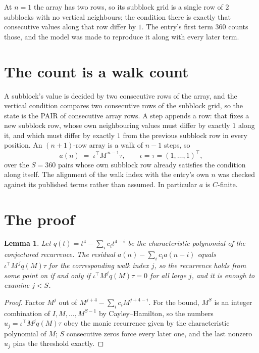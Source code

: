 \documentclass[11pt,a4paper]{article}
\theoremstyle{plain}
\newtheorem{lemma}[theorem]{Lemma}
\theoremstyle{definition}
\begin{document}
At $n=1$ the array has two rows, so its subblock grid is a single row of $2$ subblocks with
no vertical neighbours; the condition there is exactly that consecutive values along that row
differ by $1$. The entry's first term $360$ counts those, and the model was made to
reproduce it along with every later term.

\section{The count is a walk count}

A subblock's value is decided by two consecutive rows of the array, and the
vertical condition compares two consecutive rows of the subblock grid, so the state is the
PAIR of consecutive array rows. A step appends a row: that fixes a new subblock row, whose own
neighbouring values must differ by exactly $1$ along it, and which must differ by exactly
$1$ from the previous subblock row in every position. An $(n+1)$-row array is a walk of
$n-1$ steps, so
\[
a(n)\;=\;\iota^{\!\top}M^{\,n-1}\tau,\qquad\iota=\tau=(1,\dots,1)^{\!\top},
\]
over the $S=360$ pairs whose own subblock row already satisfies the condition along itself.
The alignment of the walk index with the entry's own $n$ was checked against its published
terms rather than assumed. In particular $a$ is $C$-finite.

\section{The proof}

\begin{lemma}\label{lem:crit}
Let $q(t)=t^{4}-\sum_i c_it^{4-i}$ be the characteristic polynomial of the
conjectured recurrence. The residual $a(n)-\sum_ic_ia(n-i)$ equals
$\iota^{\!\top}M^{\,j}q(M)\tau$ for the corresponding walk index $j$, so the recurrence
holds from some point on if and only if $\iota^{\!\top}M^{j}q(M)\tau=0$ for all large $j$,
and it is enough to examine $j<S$.
\end{lemma}

\begin{proof}
Factor $M^{j}$ out of $M^{j+4}-\sum_ic_iM^{j+4-i}$. For the bound, $M^{S}$
is an integer combination of $I,M,\dots,M^{S-1}$ by Cayley--Hamilton, so the numbers
$u_j=\iota^{\!\top}M^{j}q(M)\tau$ obey the monic recurrence given by the characteristic
polynomial of $M$; $S$ consecutive zeros force every later one, and the last nonzero $u_j$
pins the threshold exactly.
\end{proof}
\end{document}
